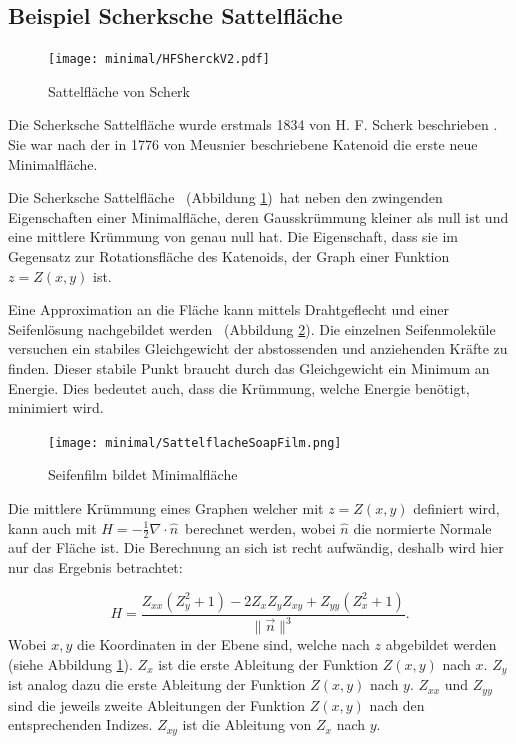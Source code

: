 \begin{refsection}
\subsection{Beispiel Scherksche Sattelfläche}
%
%
\label{minimal:ScherkSattel}
\begin{figure}
  \centering
  \texttt{[image: minimal/HFSherckV2.pdf]}
  \caption{Sattelfläche von Scherk} 
  \label{fig:Scherk}
\end{figure}
Die Scherksche Sattelfläche wurde erstmals 1834 von H. F. Scherk beschrieben \cite{minimal:JournalAM}. Sie war nach der in 1776 von Meusnier beschriebene Katenoid die erste neue Minimalfläche. 
%

Die Scherksche Sattelfläche \, (Abbildung \ref{fig:Scherk})\, hat neben den zwingenden Eigenschaften einer Minimalfläche, deren Gausskrümmung kleiner als null ist und eine mittlere Krümmung von genau null hat. Die Eigenschaft, dass sie im Gegensatz zur Rotationsfläche des Katenoids, der Graph einer Funktion $z=Z(x,y)$ ist. 

Eine Approximation an die Fläche kann mittels Drahtgeflecht und einer Seifenlösung nachgebildet werden \, (Abbildung \ref{fig:SoapScherk}). Die einzelnen Seifenmoleküle versuchen ein stabiles Gleichgewicht der abstossenden und anziehenden Kräfte zu finden. Dieser stabile Punkt braucht durch das Gleichgewicht ein Minimum an Energie. Dies bedeutet auch, dass die Krümmung, welche Energie benötigt, minimiert wird.
\begin{figure}
  \centering
  \texttt{[image: minimal/SattelflacheSoapFilm.png]}
  \caption{Seifenfilm bildet Minimalfläche} 
  \label{fig:SoapScherk}
\end{figure}


Die mittlere Krümmung eines Graphen welcher mit $z=Z(x,y)$ definiert wird, kann auch mit $H=-\frac{1}{2} \nabla \cdot \hat{n}$\, \cite{minimal:Spivak}  berechnet werden, wobei $\hat{n}$ die normierte Normale auf der Fläche ist. Die Berechnung an sich ist recht aufwändig, deshalb wird hier nur das Ergebnis betrachtet:

\begin{equation}\label{MeanCurv}
H=\frac{Z_{xx}(Z_y^2+1) - 2 Z_xZ_yZ_{xy}+Z_{yy}(Z_x^2+1)}{\|\vec{n}\|^3}.
\end{equation}
Wobei ${x,y}$ die Koordinaten in der Ebene sind, welche nach $z$ abgebildet werden (siehe Abbildung \ref{fig:Scherk}). $Z_x$ ist die erste Ableitung der Funktion $Z(x,y)$ nach $x$. $Z_y$ ist analog dazu die erste Ableitung der Funktion $Z(x,y)$ nach $y$. $Z_{xx}$ und $Z_{yy}$ sind die jeweils zweite Ableitungen der Funktion $Z(x,y)$ nach den entsprechenden Indizes. $Z_{xy}$ ist die Ableitung von $Z_x$ nach $y$.


\end{refsection}
